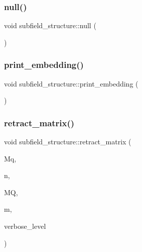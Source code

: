 \mbox{\label{classsubfield__structure_a055260480ba8b8d9ec922824f57e7de2}} 
\subsubsection{\texorpdfstring{null()}{null()}}
{\footnotesize\ttfamily void subfield\+\_\+structure\+::null (\begin{DoxyParamCaption}{ }\end{DoxyParamCaption})}

\mbox{\label{classsubfield__structure_a5bcae8711147955f252614a1bf8d1eea}} 
\subsubsection{\texorpdfstring{print\+\_\+embedding()}{print\_embedding()}}
{\footnotesize\ttfamily void subfield\+\_\+structure\+::print\+\_\+embedding (\begin{DoxyParamCaption}{ }\end{DoxyParamCaption})}

\mbox{\label{classsubfield__structure_a4413bf5b9f9c9652b6f50b1b3024a7df}} 
\subsubsection{\texorpdfstring{retract\+\_\+matrix()}{retract\_matrix()}}
{\footnotesize\ttfamily void subfield\+\_\+structure\+::retract\+\_\+matrix (\begin{DoxyParamCaption}\item[{\mbox{\hyperlink{galois_8h_a09fddde158a3a20bd2dcadb609de11dc}{I\+NT}} $\ast$}]{Mq,  }\item[{\mbox{\hyperlink{galois_8h_a09fddde158a3a20bd2dcadb609de11dc}{I\+NT}}}]{n,  }\item[{\mbox{\hyperlink{galois_8h_a09fddde158a3a20bd2dcadb609de11dc}{I\+NT}} $\ast$}]{MQ,  }\item[{\mbox{\hyperlink{galois_8h_a09fddde158a3a20bd2dcadb609de11dc}{I\+NT}}}]{m,  }\item[{\mbox{\hyperlink{galois_8h_a09fddde158a3a20bd2dcadb609de11dc}{I\+NT}}}]{verbose\+\_\+level }\end{DoxyParamCaption})}



